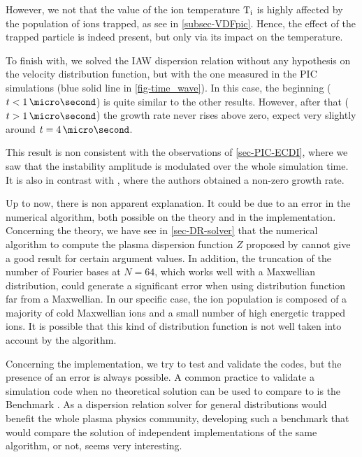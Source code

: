   However, we not that the value of the ion temperature $\mathrm{T_i}$ is highly affected by the population of ions trapped, as see in \cref{subsec-VDFpic}.
  Hence, the effect of the trapped particle is indeed present, but only via its impact on the temperature.
  
  \vspace{1em}
  To finish with, we solved the \ac{IAW} dispersion relation without any hypothesis on the velocity distribution function, but with the one measured in the PIC simulations (blue solid line in  \cref{fig-time_wave}).
  In this case, the beginning ($t < 1 \,\micro\second$) is quite similar to the other results.
  However, after that ($t > 1 \,\micro\second$) the growth rate never rises above zero, expect very slightly around $t=4\,\micro\second$.
  
  This result is non consistent with the observations of \cref{sec-PIC-ECDI}, where we saw that the instability amplitude is modulated over the whole simulation time.
  It is also in contrast with \citet{lafleur2018}, where the authors obtained a non-zero growth rate.
  
  Up to now, there is non apparent explanation.
  It could be due to an error in the numerical algorithm, both possible on the theory and in the implementation.
  Concerning the theory, we have see in \cref{sec-DR-solver} that the numerical algorithm to compute the plasma dispersion function $Z$ proposed by \citet{xiehua-sheng2013} cannot give a good result for certain argument values.
  In addition, the truncation of the number of Fourier bases at $N=64$, which works well with a Maxwellian distribution, could generate a significant error when using distribution function far from a Maxwellian.
  In our specific case, the ion population is composed of a majority of cold Maxwellian ions and a small number of high energetic trapped ions.
  It is possible that this kind of distribution function is not well taken into account by the algorithm.
  
  Concerning the implementation, we try to test and validate the codes, but the presence of an error is always possible.
  A common practice to validate a simulation code when no theoretical solution can be used to compare to is the Benchmark \citep{turner2013}.
  As a dispersion relation solver for general distributions would benefit the whole plasma physics community, developing such a benchmark that would compare the solution of independent implementations of the same algorithm, or not, seems very interesting.
  
  